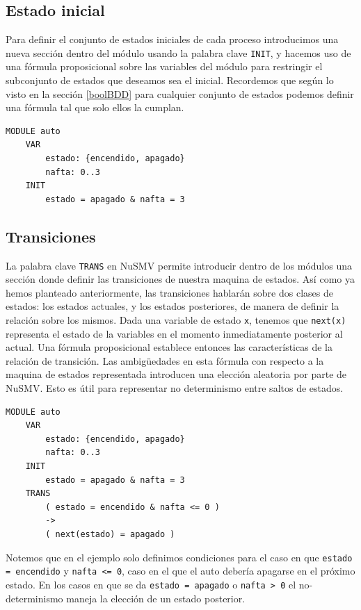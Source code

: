 \documentclass[titlepage, 12pt]{book}
\begin{document}
\subsection*{Estado inicial}

Para definir el conjunto de estados iniciales de cada proceso introducimos una nueva secci\'on dentro del m\'odulo usando la palabra clave \texttt{INIT}, y hacemos uso de una f\'ormula proposicional sobre las variables del m\'odulo para restringir el subconjunto de estados que deseamos sea el inicial. Recordemos que seg\'un lo visto en la secci\'on \ref{boolBDD} para cualquier conjunto de estados podemos definir una f\'ormula tal que solo ellos la cumplan.
\begin{verbatim}
MODULE auto
    VAR
        estado: {encendido, apagado}
        nafta: 0..3
    INIT
        estado = apagado & nafta = 3
\end{verbatim}


\subsection*{Transiciones}

La palabra clave \texttt{TRANS} en NuSMV permite introducir dentro de los m\'odulos una secci\'on donde definir las transiciones de nuestra maquina de estados. As\'i como ya hemos planteado anteriormente, las transiciones hablar\'an sobre dos clases de estados: los estados actuales, y los estados posteriores, de manera de definir la relaci\'on sobre los mismos. Dada una variable de estado \texttt{x}, tenemos que \texttt{next(x)} representa el estado de la variables en el momento inmediatamente posterior al actual. Una f\'ormula proposicional establece entonces las caracter\'isticas de la relaci\'on de transici\'on. Las ambigüedades en esta f\'ormula con respecto a la maquina de estados representada introducen una elecci\'on aleatoria por parte de NuSMV. Esto es \'util para representar no determinismo entre saltos de estados.

\begin{verbatim}
MODULE auto
    VAR
        estado: {encendido, apagado}
        nafta: 0..3
    INIT
        estado = apagado & nafta = 3
    TRANS
        ( estado = encendido & nafta <= 0 ) 
        -> 
        ( next(estado) = apagado )

\end{verbatim}

Notemos que en el ejemplo solo definimos condiciones para el caso en que \texttt{estado = encendido} y \texttt{nafta <= 0}, caso en el que el auto deber\'ia apagarse en el pr\'oximo estado. En los casos en que se da \texttt{estado = apagado} o \texttt{nafta > 0} el no-determinismo maneja la elecci\'on de un estado posterior.
\end{document}
